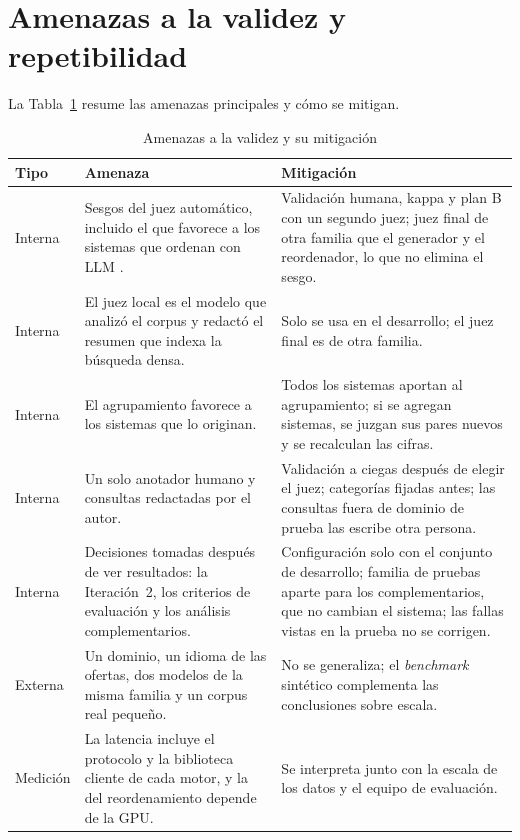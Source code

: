 \section{Amenazas a la validez y repetibilidad}
\label{sec:met-validez}
\label{sec:met-reproducibilidad}

La Tabla~\ref{tab:met-validez} resume las amenazas principales y cómo se mitigan.

\begin{table}[!htb]
    \centering
    \caption{Amenazas a la validez y su mitigación}
    \label{tab:met-validez}
    \footnotesize
    \begin{tabular}{|p{2cm}|p{6.3cm}|p{5.9cm}|}
        \hline
        \textbf{Tipo} & \textbf{Amenaza} & \textbf{Mitigación} \\
        \hline
        Interna & Sesgos del juez automático, incluido el que favorece a los sistemas que ordenan con LLM \citep{Frobe2025}. & Validación humana, kappa y plan B con un segundo juez; juez final de otra familia que el generador y el reordenador, lo que no elimina el sesgo. \\
        \hline
        Interna & El juez local es el modelo que analizó el corpus y redactó el resumen que indexa la búsqueda densa. & Solo se usa en el desarrollo; el juez final es de otra familia. \\
        \hline
        Interna & El agrupamiento favorece a los sistemas que lo originan. & Todos los sistemas aportan al agrupamiento; si se agregan sistemas, se juzgan sus pares nuevos y se recalculan las cifras. \\
        \hline
        Interna & Un solo anotador humano y consultas redactadas por el autor. & Validación a ciegas después de elegir el juez; categorías fijadas antes; las consultas fuera de dominio de prueba las escribe otra persona. \\
        \hline
        Interna & Decisiones tomadas después de ver resultados: la Iteración~2, los criterios de evaluación y los análisis complementarios. & Configuración solo con el conjunto de desarrollo; familia de pruebas aparte para los complementarios, que no cambian el sistema; las fallas vistas en la prueba no se corrigen. \\
        \hline
        Externa & Un dominio, un idioma de las ofertas, dos modelos de la misma familia y un corpus real pequeño. & No se generaliza; el \textit{benchmark} sintético complementa las conclusiones sobre escala. \\
        \hline
        Medición & La latencia incluye el protocolo y la biblioteca cliente de cada motor, y la del reordenamiento depende de la GPU. & Se interpreta junto con la escala de los datos y el equipo de evaluación. \\

\end{tabular}
\end{table}
